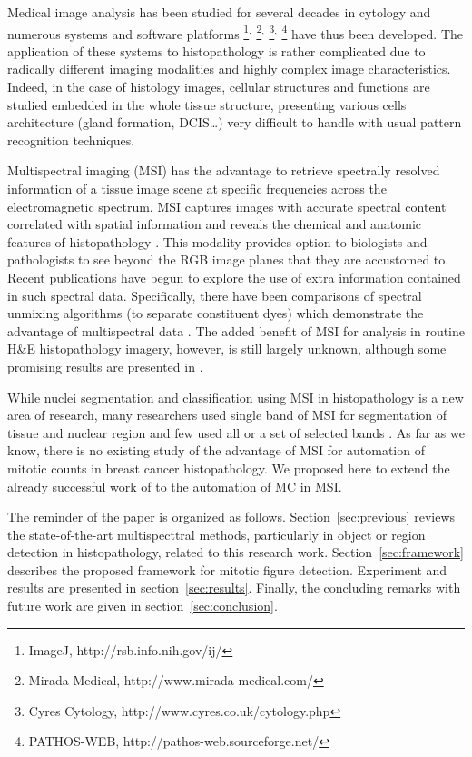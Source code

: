 \documentclass[10pt,twocolumn,letterpaper]{article}
\begin{document}
Medical image analysis has been studied for several decades in cytology and numerous systems \cite{wolberg1993, stewart1998, cibas2009, plissiti2013, gong2013} and software platforms
\footnote{ImageJ, http://rsb.info.nih.gov/ij/}$^,$
\footnote{Mirada Medical, http://www.mirada-medical.com/}$^,$
\footnote{Cyres Cytology, http://www.cyres.co.uk/cytology.php}$^,$
\footnote{PATHOS-WEB, http://pathos-web.sourceforge.net/}
have thus been developed. The application of these systems to histopathology is rather complicated due to radically different imaging modalities and highly complex image characteristics. Indeed, in the case of histology images, cellular structures and functions are studied embedded in the whole tissue structure, presenting various cells architecture (gland formation, DCIS…) very difficult to handle with usual pattern recognition techniques.
 
Multispectral imaging (MSI) has the advantage to retrieve spectrally resolved information of a tissue image scene at specific frequencies across the electromagnetic spectrum. MSI captures images with accurate spectral content correlated with spatial information and reveals the chemical and anatomic features of histopathology \cite{levenson2006b, levenson2008}. This modality provides option to biologists and pathologists to see beyond the RGB image planes that they are accustomed to. Recent publications \cite{fernandez2005, levenson2006, wu2012, khelifi2012} have begun to explore the use of extra information contained in such spectral data. Specifically, there have been comparisons of spectral unmixing algorithms (to separate constituent dyes) which demonstrate the advantage of multispectral data \cite{levenson2003, gentry1999}. The added benefit of MSI for analysis in routine H\&E histopathology imagery, however, is still largely unknown, although some promising results are presented in \cite{roula2003, fernandez2005, khelifi2012, wu2012}.

While nuclei segmentation and classification using MSI in histopathology is a new area of research, many researchers used single band of MSI for segmentation of tissue and nuclear region \cite{boucheron2007, wu2009, masood2009} and few used all or a set of selected bands \cite{fernandez2005, khelifi2012}. As far as we know, there is no existing study of the advantage of MSI for automation of mitotic counts in breast cancer histopathology. We proposed here to extend the already successful work of \cite{irshad2013b} to the automation of MC in MSI.

The reminder of the paper is organized as follows. Section~\ref{sec:previous} reviews the state-of-the-art multispecttral methods, particularly in object or region detection in histopathology, related to this research work. Section~\ref{sec:framework} describes the proposed framework for mitotic figure detection. Experiment and results are presented in section~\ref{sec:results}. Finally, the concluding remarks with future work are given in section~\ref{sec:conclusion}.
\end{document}

